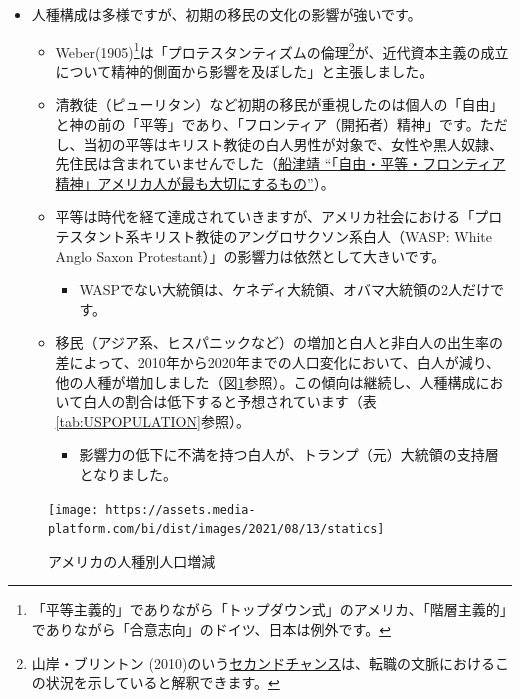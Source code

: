 \documentclass[
]{book}
\providecommand{\tightlist}{%
  \setlength{\itemsep}{0pt}\setlength{\parskip}{0pt}}
\begin{document}
\begin{itemize}
\item
  人種構成は多様ですが、初期の移民の文化の影響が強いです。

  \begin{itemize}
  \item
    Weber(1905)\footnote{「平等主義的」でありながら「トップダウン式」のアメリカ、「階層主義的」でありながら「合意志向」のドイツ、日本は例外です。}は「プロテスタンティズムの倫理\footnote{山岸・ブリントン (2010)のいう\protect\hyperlink{labor}{セカンドチャンス}は、転職の文脈におけるこの状況を示していると解釈できます。}が、近代資本主義の成立について精神的側面から影響を及ぼした」と主張しました。
  \item
    清教徒（ピューリタン）など初期の移民が重視したのは個人の「自由」と神の前の「平等」であり、「フロンティア（開拓者）精神」です。ただし、当初の平等はキリスト教徒の白人男性が対象で、女性や黒人奴隷、先住民は含まれていませんでした（\href{https://yumenavi.info/lecture.aspx?GNKCD=g008685}{船津靖 ``「自由・平等・フロンティア精神」アメリカ人が最も大切にするもの''}）。
  \item
    平等は時代を経て達成されていきますが、アメリカ社会における「プロテスタント系キリスト教徒のアングロサクソン系白人（WASP: White Anglo Saxon Protestant）」の影響力は依然として大きいです。

    \begin{itemize}
    \tightlist
    \item
      WASPでない大統領は、ケネディ大統領、オバマ大統領の2人だけです。\\
    \end{itemize}
  \item
    移民（アジア系、ヒスパニックなど）の増加と白人と非白人の出生率の差によって、2010年から2020年までの人口変化において、白人が減り、他の人種が増加しました（図\ref{fig:RACE}参照）。この傾向は継続し、人種構成において白人の割合は低下すると予想されています（表\ref{tab:USPOPULATION}参照）。

    \begin{itemize}
    \tightlist
    \item
      影響力の低下に不満を持つ白人が、トランプ（元）大統領の支持層となりました。
    \end{itemize}
  \end{itemize}
\end{itemize}

\begin{figure}
\texttt{[image: https://assets.media-platform.com/bi/dist/images/2021/08/13/statics]} \caption{アメリカの人種別人口増減}\label{fig:RACE}
\end{figure}
\end{document}
